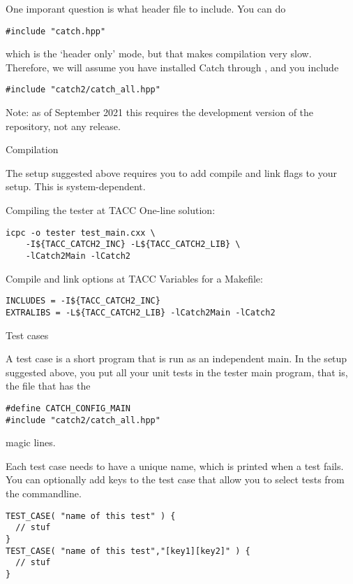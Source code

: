 One imporant question is what header file to include.
You can do 
\begin{lstlisting}
#include "catch.hpp"
\end{lstlisting}
which is the `header only' mode,
but that makes compilation very slow.
Therefore, we will assume you have installed Catch through ,
and you include
\begin{lstlisting}
#include "catch2/catch_all.hpp"
\end{lstlisting}
Note: as of September 2021 this requires the development version of the repository,
not any  release.

 {Compilation}

The setup suggested above requires you to add compile and link flags to your setup.
This is system-dependent.

\begin{tacc}
\begin{block}{Compiling the tester at TACC}
\label{sl:catch-compile}
One-line solution:
\begin{verbatim}
icpc -o tester test_main.cxx \
    -I${TACC_CATCH2_INC} -L${TACC_CATCH2_LIB} \
    -lCatch2Main -lCatch2
\end{verbatim}
\end{block}
\begin{block}{Compile and link options at TACC}
\label{sl:catch-compile-options}
Variables for a Makefile:
\begin{verbatim}
INCLUDES = -I${TACC_CATCH2_INC}
EXTRALIBS = -L${TACC_CATCH2_LIB} -lCatch2Main -lCatch2
\end{verbatim}
\end{block}
\end{tacc}

 {Test cases}

A test case is a short program that is run as an independent main.
In the setup suggested above, you put all your unit tests
in the tester main program, that is,
the file that has the
\begin{lstlisting}
#define CATCH_CONFIG_MAIN
#include "catch2/catch_all.hpp"
\end{lstlisting}
magic lines.

Each test case needs to have a unique name,
which is printed when a test fails.
You can optionally add keys to the test case
that allow you to select tests from the commandline.

\begin{lstlisting}
TEST_CASE( "name of this test" ) {
  // stuf
}
TEST_CASE( "name of this test","[key1][key2]" ) {
  // stuf
}
\end{lstlisting}

